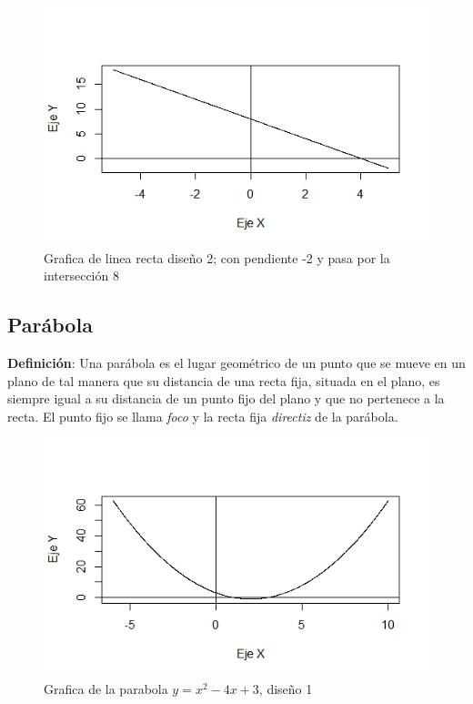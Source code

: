 \documentclass[12pt,a4paper]{article} %
\begin{document}
\begin{figure}
\centering
\includegraphics[scale=0.75]{Recta3.png}
\caption{Grafica de linea recta diseño 2; con pendiente -2 y pasa por la intersección 8}
\end{figure}

\subsection{Parábola} \label{subsec:parabola}

\textbf{Definici\'{o}n}: Una parábola es el lugar geométrico de un punto que se mueve en un plano de tal manera que su distancia de una recta fija, situada en el plano, es siempre igual a su distancia de un punto fijo del plano y que no pertenece a la recta. El punto fijo se llama \textit{foco} y la recta fija \textit{directiz} de la parábola.

\begin{figure}
\centering
\includegraphics[scale=0.75]{Parabola2.png}
\caption{Grafica de la parabola $y=x^2-4x+3$, diseño 1}
\end{figure}
\end{document}
